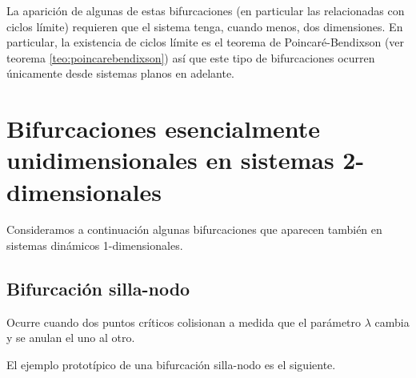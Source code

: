 \documentclass[11pt]{book}
\theoremstyle{definition}
\numberwithin{definition}{section}
\theoremstyle{theorem}
\numberwithin{theorem}{section}
\numberwithin{lemma}{section}
\numberwithin{corollary}{section}
\theoremstyle{plain}
\numberwithin{example}{section}
\begin{document}
La aparición de algunas de estas bifurcaciones (en particular las relacionadas con ciclos límite) requieren que el sistema tenga, cuando menos, dos dimensiones. En particular, la existencia de ciclos límite es el teorema de Poincaré-Bendixson (ver teorema \ref{teo:poincarebendixson}) así que este tipo de bifurcaciones ocurren únicamente desde sistemas planos en adelante.

\section{Bifurcaciones esencialmente unidimensionales en sistemas 2-dimensionales}

Consideramos a continuación algunas bifurcaciones que aparecen también en sistemas dinámicos 1-dimensionales.

\subsection{Bifurcación silla-nodo} \label{sec:bifurcacionsillanodo}
Ocurre cuando dos puntos críticos colisionan a medida que el parámetro $\lambda$ cambia y se anulan el uno al otro.

El ejemplo prototípico de una bifurcación silla-nodo es el siguiente.
\end{document}

